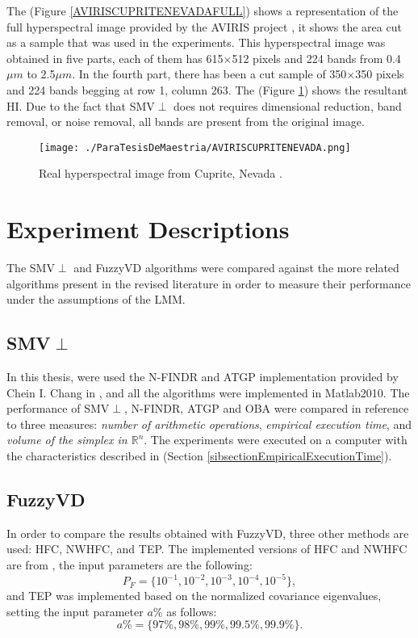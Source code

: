 \documentclass[11pt, oneside]{Thesis} %
\begin{document}
The (Figure \ref{AVIRISCUPRITENEVADAFULL}) shows a representation of the full hyperspectral 
image provided by the AVIRIS project \cite{AVIRIS}, it shows the area cut as a sample that 
was used in the experiments. This hyperspectral image was obtained in five parts, each of 
them has 615$\times$512 pixels and 224 bands from 0.4$\mu m$ to 2.5$\mu m$. In the fourth 
part, there has been a cut sample of 350$\times$350 pixels and 224 bands begging at row 1, 
column 263. The (Figure \ref{AVIRISCUPRITENEVADA}) shows the resultant HI. Due to the fact 
that SMV$\perp$ does not requires dimensional reduction, band removal, or noise removal, 
all bands are present from the original image.
\begin{figure}[ht]
  \centering
  \texttt{[image: ./ParaTesisDeMaestria/AVIRISCUPRITENEVADA.png]}
  \centering
  \caption{Real hyperspectral image from Cuprite, Nevada \cite{AVIRIS}.}
  \label{AVIRISCUPRITENEVADA}
\end{figure}


\section{Experiment Descriptions}

The SMV$\perp$ and FuzzyVD algorithms were compared against the more related algorithms 
present in the revised literature in order to measure their performance under the 
assumptions of the LMM.


\subsection{SMV$\perp$}

In this thesis, were used the N-FINDR and ATGP implementation provided by Chein I. 
Chang in \cite{ChangBig2013}, and all the algorithms were implemented in Matlab2010. 
The performance of SMV$\perp$, N-FINDR, ATGP and OBA were compared in reference 
to three measures: \emph{number of arithmetic operations}, \emph{empirical execution 
time}, and \emph{volume of the simplex in $\mathbb{R}^n$}. The experiments were 
executed on a computer with the characteristics described in (Section 
\ref{sibsectionEmpiricalExecutionTime}).



\subsection{FuzzyVD}

In order to compare the results obtained with FuzzyVD, three other methods are 
used: HFC, NWHFC, and TEP. The implemented versions of HFC and NWHFC are from 
\cite{ChangBig2013}, the input parameters are the following: \[P_F = \lbrace 
10^{-1}, 10^{-2}, 10^{-3}, 10^{-4}, 10^{-5} \rbrace,\] and TEP was implemented 
based on the normalized covariance eigenvalues, setting the input parameter $a\%$ 
as follows: \[a\% = \lbrace 97\%, 98\%, 99\%, 99.5\%, 99.9\% \rbrace.\] 
\end{document}
